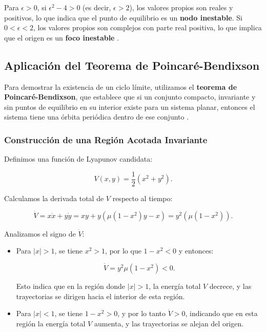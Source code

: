 Para \(\epsilon > 0\), si \(\epsilon^2 - 4 > 0\) (es decir, \(\epsilon > 2\)), los valores propios son reales y positivos, lo que indica que el punto de equilibrio es un \textbf{nodo inestable}. Si \(0 < \epsilon < 2\), los valores propios son complejos con parte real positiva, lo que implica que el origen es un \textbf{foco inestable} \cite{guckenheimer1983nonlinear}.

\subsection*{Aplicación del Teorema de Poincaré-Bendixson}

Para demostrar la existencia de un ciclo límite, utilizamos el \textbf{teorema de Poincaré-Bendixson}, que establece que si un conjunto compacto, invariante y sin puntos de equilibrio en su interior existe para un sistema planar, entonces el sistema tiene una órbita periódica dentro de ese conjunto \cite{wiggins2003introduction}.

\subsubsection{Construcción de una Región Acotada Invariante}

Definimos una función de Lyapunov candidata:

\begin{equation}
    V(x, y) = \dfrac{1}{2} \left( x^2 + y^2 \right).
\end{equation}

Calculamos la derivada total de \( V \) respecto al tiempo:

\begin{equation}
    \dot{V} = x \dot{x} + y \dot{y} = x y + y \left( \mu (1 - x^2) y - x \right) = y^2 \left( \mu (1 - x^2) \right).
\end{equation}

Analizamos el signo de \( \dot{V} \):

\begin{itemize}
    \item Para \( |x| > 1 \), se tiene \( x^2 > 1 \), por lo que \( 1 - x^2 < 0 \) y entonces:

    \begin{equation}
        \dot{V} = y^2 \mu (1 - x^2) < 0.
    \end{equation}

    Esto indica que en la región donde \( |x| > 1 \), la energía total \( V \) decrece, y las trayectorias se dirigen hacia el interior de esta región.

    \item Para \( |x| < 1 \), se tiene \( 1 - x^2 > 0 \), y por lo tanto \( \dot{V} > 0 \), indicando que en esta región la energía total \( V \) aumenta, y las trayectorias se alejan del origen.
\end{itemize}

